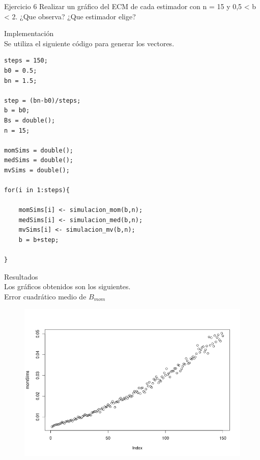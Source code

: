 



\begin{section}{Ejercicio 6}
Realizar un gráfico del ECM de cada estimador con n = 15 y 0,5 < b < 2. ¿Que observa?
¿Que estimador elige?

\begin{subsection}{Implementación}~\\


Se utiliza el siguiente código para generar los vectores.
\begin{verbatim}
steps = 150;
b0 = 0.5;
bn = 1.5;

step = (bn-b0)/steps;
b = b0;
Bs = double();
n = 15;

momSims = double();
medSims = double();
mvSims = double();

for(i in 1:steps){

	momSims[i] <- simulacion_mom(b,n);
	medSims[i] <- simulacion_med(b,n);
	mvSims[i] <- simulacion_mv(b,n);
	b = b+step;

}
\end{verbatim}


\end{subsection}
\newpage
\begin{subsection}{Resultados}~\\
Los gráficos obtenidos son los siguientes.\\

Error cuadrático medio de $B_{mom}$
\begin{figure}[H]
\includegraphics[scale=0.65]{plots/momSims.png}
\centering
\end{figure}
~\\
~\\


\end{subsection}
\end{section}
